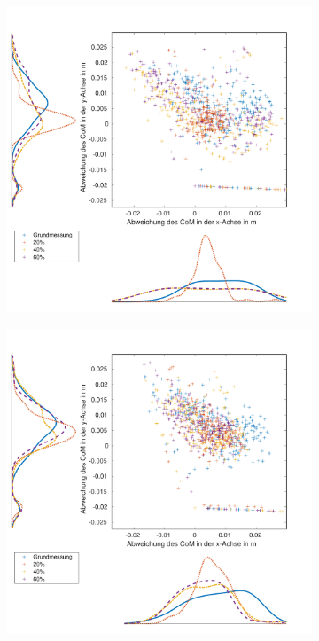 \begin{figure}[tb]
	\centering
	\begin{adjustwidth}{-0.2\linewidth}{-0.2\linewidth}
		\hspace{40pt}
		\begin{subfigure}[c]{.45\linewidth}
			\centering
			\includegraphics[width=\linewidth]{Bilder/links_CoM_ohneM.pdf}
			\vspace{5pt}
		\end{subfigure}
		\hspace{-10pt}
		\begin{subfigure}[c]{.45\linewidth}
			\centering
			\includegraphics[width=\linewidth]{Bilder/links_CoM_mitM.pdf}

\end{subfigure}
\end{adjustwidth}
\end{figure}
